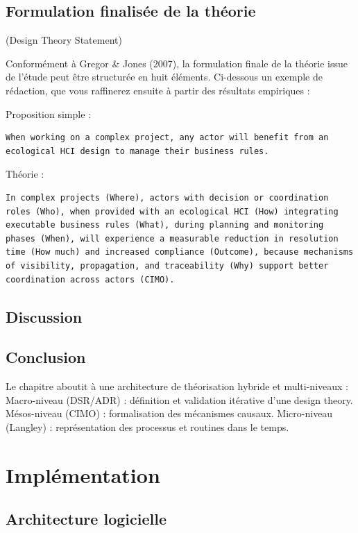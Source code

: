 \documentclass[a4paper,12pt]{article}
\begin{document}
\subsection{Formulation finalisée de la théorie}
\label{sec:org14abe8b}
(Design Theory Statement)

Conformément à Gregor \& Jones (2007), la formulation finale de la théorie issue de l’étude peut être structurée en huit éléments. Ci-dessous un exemple de rédaction, que vous raffinerez ensuite à partir des résultats empiriques :

Proposition simple :
\begin{verbatim}
When working on a complex project, any actor will benefit from an ecological HCI design to manage their business rules.
\end{verbatim}

Théorie :
\begin{verbatim}
In complex projects (Where), actors with decision or coordination roles (Who), when provided with an ecological HCI (How) integrating executable business rules (What), during planning and monitoring phases (When), will experience a measurable reduction in resolution time (How much) and increased compliance (Outcome), because mechanisms of visibility, propagation, and traceability (Why) support better coordination across actors (CIMO).
\end{verbatim}
\subsection{Discussion}
\label{sec:org5755b10}

\subsection{Conclusion}
\label{sec:org380f743}
Le chapitre aboutit à une architecture de théorisation hybride et multi-niveaux :
Macro-niveau (DSR/ADR) : définition et validation itérative d’une design theory.
Mésos-niveau (CIMO) : formalisation des mécanismes causaux.
Micro-niveau (Langley) : représentation des processus et routines dans le temps.
\clearpage
\section{Implémentation}
\label{sec:orgacf1b19}
\subsection{Architecture logicielle}
\label{sec:orgecfd6f3}
\end{document}
